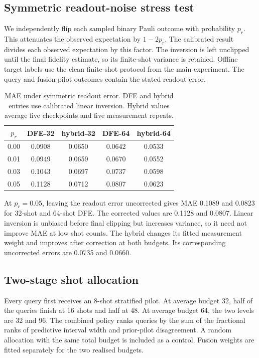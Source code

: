 \documentclass[10pt]{article}
\begin{document}
\subsection{Symmetric readout-noise stress test}
We independently flip each sampled binary Pauli outcome with probability $p_r$. This attenuates the observed expectation by $1-2p_r$. The calibrated result divides each observed expectation by this factor. The inversion is left unclipped until the final fidelity estimate, so its finite-shot variance is retained. Offline target labels use the clean finite-shot protocol from the main experiment. The query and fusion-pilot outcomes contain the stated readout error.

\begin{table}[h]
\centering
\caption{MAE under symmetric readout error. DFE and hybrid entries use calibrated linear inversion. Hybrid values average five checkpoints and five measurement repeats.}
\label{tab:supp_readout}
\begin{tabular}{ccccc}
\toprule
$p_r$ & DFE-32 & hybrid-32 & DFE-64 & hybrid-64 \\
\midrule
0.00 & 0.0908 & 0.0650 & 0.0642 & 0.0533 \\
0.01 & 0.0949 & 0.0659 & 0.0670 & 0.0552 \\
0.03 & 0.1043 & 0.0697 & 0.0737 & 0.0598 \\
0.05 & 0.1128 & 0.0712 & 0.0807 & 0.0623 \\
\bottomrule
\end{tabular}
\end{table}

At $p_r=0.05$, leaving the readout error uncorrected gives MAE 0.1089 and 0.0823 for 32-shot and 64-shot DFE. The corrected values are 0.1128 and 0.0807. Linear inversion is unbiased before final clipping but increases variance, so it need not improve MAE at low shot counts. The hybrid changes its fitted measurement weight and improves after correction at both budgets. Its corresponding uncorrected errors are 0.0735 and 0.0660.

\subsection{Two-stage shot allocation}
Every query first receives an 8-shot stratified pilot. At average budget 32, half of the queries finish at 16 shots and half at 48. At average budget 64, the two levels are 32 and 96. The combined policy ranks queries by the sum of the fractional ranks of predictive interval width and prior-pilot disagreement. A random allocation with the same total budget is included as a control. Fusion weights are fitted separately for the two realised budgets.
\end{document}
